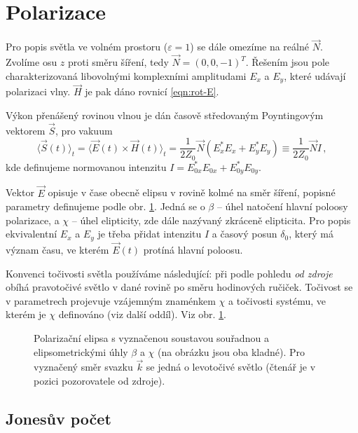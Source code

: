 \section{Polarizace}
\label{chap:polarizace}

Pro popis světla ve volném prostoru ($\varepsilon=1$) se dále omezíme na reálné $\vec{N}$.
Zvolíme osu $z$ proti směru šíření, tedy $\vec{N}=(0,0,-1)^T$.
Řešením jsou pole charakterizovaná libovolnými komplexními amplitudami $E_x$ a $E_y$, které udávají polarizaci vlny.
$\vec{H}$ je pak dáno rovnicí \eqref{eqn:rot-E}.

Výkon přenášený rovinou vlnou je dán časově středovaným Poyntingovým vektorem $\vec{S}$, pro vakuum\cite{bornPrinciplesOpticsElectromagnetic1999}
\begin{equation} \label{eqn:Poynting}
    \langle \vec{S}(t)\rangle_t=\langle\vec{E}(t)\times\vec{H}(t)\rangle_t=\frac{1}{2 Z_0}\vec{N} \left( E_x^*E_x+E_y^*E_y \right)
    \equiv \frac{1}{2 Z_0}\vec{N} I\,,
\end{equation}
kde definujeme normovanou intenzitu $I=E_{0x}^*E_{0x}+E_{0y}^*E_{0y}$.

Vektor $\vec{E}$ opisuje v čase obecně elipsu v rovině kolmé na směr šíření, popisné parametry definujeme podle obr. \ref{fig:polarizacni-elipsa}.
Jedná se o $\beta$ -- úhel natočení hlavní poloosy polarizace, a $\chi$ -- úhel elipticity, zde dále nazývaný zkráceně elipticita.
Pro popis ekvivalentní $E_x$ a $E_y$ je třeba přidat intenzitu $I$ a časový posun $\delta_0$, který má význam času, ve kterém $\vec{E}(t)$ protíná hlavní poloosu.

Konvenci točivosti světla používáme následující: při podle pohledu \emph{od zdroje} obíhá pravotočivé světlo v dané rovině po směru hodinových ručiček.
Točivost se v parametrech projevuje vzájemným znaménkem $\chi$ a točivosti systému, ve kterém je $\chi$ definováno (viz další oddíl).
Viz obr. \ref{fig:polarizacni-elipsa}.

\begin{figure}[htbp]
    \centering
    
    \caption{Polarizační elipsa s vyznačenou soustavou souřadnou a elipsometrickými úhly $\beta$ a $\chi$ (na obrázku jsou oba kladné).
    Pro vyznačený směr svazku $\vec{k}$ se jedná o levotočivé světlo (čtenář je v pozici pozorovatele od zdroje).}
    \label{fig:polarizacni-elipsa}
\end{figure}

\subsection{Jonesův počet}
\label{chap:Jones}

